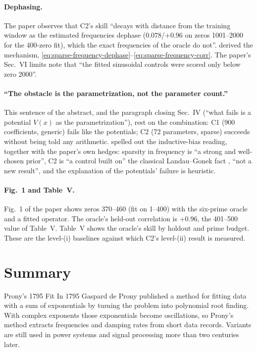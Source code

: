 \paragraph{Dephasing.} The paper observes that C2's skill ``decays with distance from the training window as the estimated frequencies dephase ($0.078$/$+0.96$ on zeros 1001--2000 for the 400-zero fit), which the exact frequencies of the oracle do not''.  derived the mechanism, \eqref{eq:sparse-frequency-dephase}--\eqref{eq:sparse-frequency-corr}. The paper's Sec.~VI limits note that ``the fitted sinusoidal controls were scored only below zero 2000''.

\paragraph{``The obstacle is the parametrization, not the parameter count.''} This sentence of the abstract, and the paragraph closing Sec.~IV (``what fails is a potential $V(x)$ as the parametrization''), rest on the combination: C1 (900 coefficients, generic) fails like the potentials; C2 (72 parameters, sparse) succeeds without being told any arithmetic.  spelled out the inductive-bias reading, together with the paper's own hedges: sparsity in frequency is ``a strong and well-chosen prior'', C2 is ``a control built on'' the classical Landau--Gonek fact \cite{landau,gonek}, ``not a new result'', and the explanation of the potentials' failure is heuristic.

\paragraph{Fig.~1 and Table~V.} Fig.~1 of the paper shows zeros 370--460 (fit on 1--400) with the six-prime oracle and a fitted operator. The oracle's held-out correlation is $+0.96$, the 401--500 value of Table~V. Table~V shows the oracle's skill by holdout and prime budget. These are the level-(i) baselines against which C2's level-(ii) result is measured.

\section{Summary}
\begin{didyouknow}{Prony's 1795 Fit}
In 1795 Gaspard de Prony published a method for fitting data with a sum of exponentials by turning the problem into polynomial root finding. With complex exponents those exponentials become oscillations, so Prony's method extracts frequencies and damping rates from short data records. Variants are still used in power systems and signal processing more than two centuries later.
\end{didyouknow}

